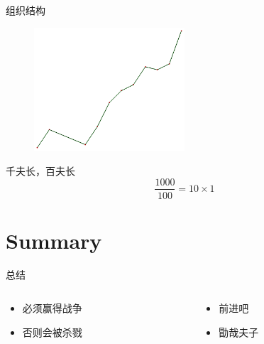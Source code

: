 \documentclass{beamer}
\begin{document}
\begin{frame}{组织结构}

\begin{figure}
\includegraphics[width=0.5\textwidth]{Splines-1.png}
\end{figure}

\begin{block}{千夫长，百夫长}
\begin{equation}
\frac{1000}{100}=10\times 1
\end{equation}
\end{block}

\end{frame}

\section{Summary}

\begin{frame}{总结}

\begin{columns}
\begin{column}{0.6\textwidth}
\begin{itemize}
\item 必须赢得战争
\item 否则会被杀戮
\end{itemize}
\end{column}
\begin{column}{0.4\textwidth}
\begin{itemize}
\item 前进吧
\item 勖哉夫子
\end{itemize}
\end{column}
\end{columns}

\end{frame}
\end{document}
